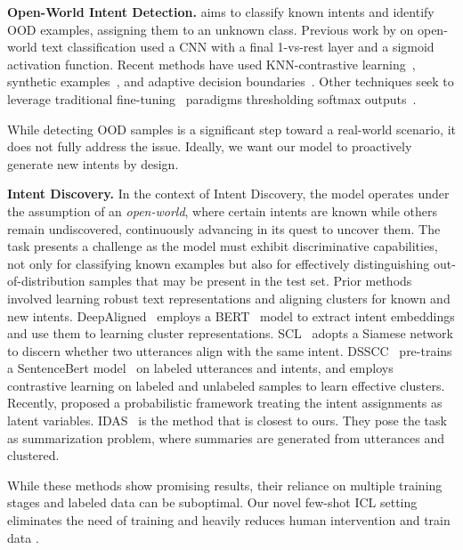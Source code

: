 \documentclass[11pt]{article}
\begin{document}
\vspace{3px}
\textbf{Open-World Intent Detection.} aims to classify known intents and identify OOD examples, assigning them to an unknown class. Previous work by \citet{shu2017doc} on open-world text classification used a CNN with a final 1-vs-rest layer and a sigmoid activation function. Recent methods have used KNN-contrastive learning~\citep{zhou2022knn}, synthetic examples~\citet{zhan2021out}, and adaptive decision boundaries~\citep{zhang2021deep}. Other techniques seek to leverage traditional fine-tuning~\citep{devlin2018bert} paradigms thresholding softmax outputs~\citep{zhang2020discriminative}.

While detecting OOD samples is a significant step toward a real-world scenario, it does not fully address the issue. Ideally, we want our model to proactively generate new intents by design.

\vspace{3px}
\textbf{Intent Discovery.} In the context of Intent Discovery, the model operates under the assumption of an \textit{open-world}, where certain intents are known while others remain undiscovered, continuously advancing in its quest to uncover them. The task presents a challenge as the model must exhibit discriminative capabilities, not only for classifying known examples but also for effectively distinguishing out-of-distribution samples that may be present in the test set. Prior methods involved learning robust text representations and aligning clusters for known and new intents. DeepAligned~\cite{zhang2021discovering} employs a BERT~\citep{devlin2018bert} model to extract intent embeddings and use them to learning cluster representations. SCL~\cite{shen2021semi} adopts a Siamese network to discern whether two utterances align with the same intent. DSSCC~\citep{kumar2022intent} pre-trains a SentenceBert model~\citep{reimers2019sentence} on labeled utterances and intents, and employs contrastive learning on labeled and unlabeled samples to learn effective clusters. Recently, \citet{zhou2023probabilistic} proposed a probabilistic framework treating the intent assignments as latent variables. IDAS~\citep{de2023idas} is the method that is closest to ours. They pose the task as summarization problem, where summaries are generated from utterances and clustered.

While these methods show promising results, their reliance on multiple training stages and labeled data can be suboptimal. Our novel few-shot ICL setting eliminates the need of training and heavily reduces human intervention and train data .
\end{document}
